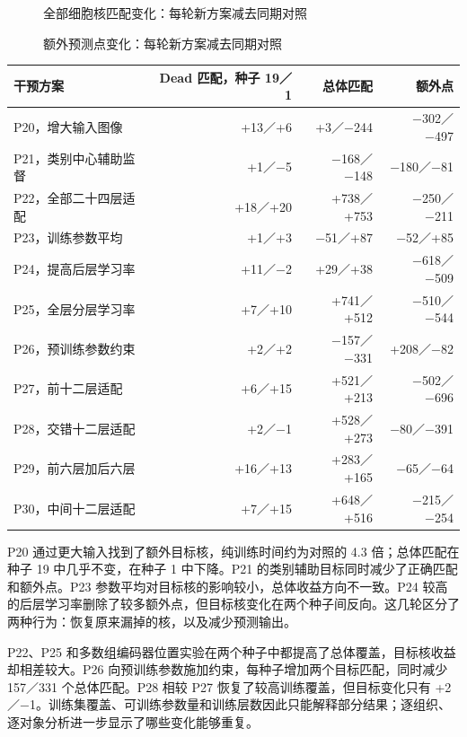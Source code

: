 \documentclass[
  11pt,
  fontset=fandol]{ctexart}
\begin{document}
\begin{figure}[H]\centering

\caption{全部细胞核匹配变化：每轮新方案减去同期对照}
\end{figure}

\begin{figure}[H]\centering

\caption{额外预测点变化：每轮新方案减去同期对照}
\end{figure}

\begin{longtable}[]{@{}lrrr@{}}
\toprule\noalign{}
干预方案 & Dead 匹配，种子 19／1 & 总体匹配 & 额外点 \\
\midrule\noalign{}
\endhead
\bottomrule\noalign{}
\endlastfoot
P20，增大输入图像 & +13／+6 & +3／−244 & −302／−497 \\
P21，类别中心辅助监督 & +1／−5 & −168／−148 & −180／−81 \\
P22，全部二十四层适配 & +18／+20 & +738／+753 & −250／−211 \\
P23，训练参数平均 & +1／+3 & −51／+87 & −52／+85 \\
P24，提高后层学习率 & +11／−2 & +29／+38 & −618／−509 \\
P25，全层分层学习率 & +7／+10 & +741／+512 & −510／−544 \\
P26，预训练参数约束 & +2／+2 & −157／−331 & +208／−82 \\
P27，前十二层适配 & +6／+15 & +521／+213 & −502／−696 \\
P28，交错十二层适配 & +2／−1 & +528／+273 & −80／−391 \\
P29，前六层加后六层 & +16／+13 & +283／+165 & −65／−64 \\
P30，中间十二层适配 & +7／+15 & +648／+516 & −215／−254 \\
\end{longtable}

P20 通过更大输入找到了额外目标核，纯训练时间约为对照的 4.3
倍；总体匹配在种子 19 中几乎不变，在种子 1 中下降。P21
的类别辅助目标同时减少了正确匹配和额外点。P23
参数平均对目标核的影响较小，总体收益方向不一致。P24
较高的后层学习率删除了较多额外点，但目标核变化在两个种子间反向。这几轮区分了两种行为：恢复原来漏掉的核，以及减少预测输出。

P22、P25
和多数组编码器位置实验在两个种子中都提高了总体覆盖，目标核收益却相差较大。P26
向预训练参数施加约束，每种子增加两个目标匹配，同时减少 157／331
个总体匹配。P28 相较 P27 恢复了较高训练覆盖，但目标变化只有
+2／−1。训练集覆盖、可训练参数量和训练层数因此只能解释部分结果；逐组织、逐对象分析进一步显示了哪些变化能够重复。
\end{document}
